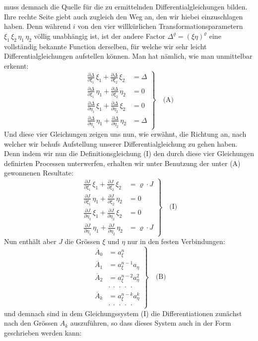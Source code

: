 \documentclass[11pt]{article}
\providecommand{\weberpage}[1]{}
\let\Delta\varDelta
\begin{document}
\weberpage{120}
muss demnach die Quelle f\"ur die zu ermittelnden Differentialgleichungen bilden. Ihre rechte Seite giebt auch zugleich den Weg an, den wir hiebei einzuschlagen haben. Denn w\"ahrend $i$ von den vier willk\"urlichen Transformationsparametern $\xi_1\, \xi_2\, \eta_1\, \eta_2$ v\"ollig unabh\"angig ist, ist der andere Factor $\Delta^{\varrho} = (\xi\eta)^{\varrho}$ eine vollst\"andig bekannte Function derselben, f\"ur welche wir sehr leicht Differentialgleichungen aufstellen k\"onnen. Man hat n\"amlich, wie man unmittelbar erkennt:
\[
\left.
\begin{aligned}
\frac{\partial \Delta}{\partial \xi_1}\, \xi_1 + \frac{\partial \Delta}{\partial \xi_2}\, \xi_2 &= \Delta\\
\frac{\partial \Delta}{\partial \xi_1}\, \eta_1 + \frac{\partial \Delta}{\partial \xi_2}\, \eta_2 &= 0\\
\frac{\partial \Delta}{\partial \eta_1}\, \xi_1 + \frac{\partial \Delta}{\partial \eta_2}\, \xi_2 &= 0\\
\frac{\partial \Delta}{\partial \eta_1}\, \eta_1 + \frac{\partial \Delta}{\partial \eta_2}\, \eta_2 &= \Delta
\end{aligned}
\right\}\quad \text{(A)}
\]
Und diese vier Gleichungen zeigen uns nun, wie erw\"ahnt, die Richtung an, nach welcher wir behufs Aufstellung unserer Differentialgleichung zu gehen haben. Denn indem wir nun die Definitionsgleichung (I) den durch diese vier Gleichungen definirten Processen unterwerfen, erhalten wir unter Benutzung der unter (A) gewonnenen Resultate:
\[
\left.
\begin{aligned}
\frac{\partial J}{\partial \xi_1}\, \xi_1 + \frac{\partial J}{\partial \xi_2}\, \xi_2 &= \varrho \cdot J\\
\frac{\partial J}{\partial \xi_1}\, \eta_1 + \frac{\partial J}{\partial \xi_2}\, \eta_2 &= 0\\
\frac{\partial J}{\partial \eta_1}\, \xi_1 + \frac{\partial J}{\partial \eta_2}\, \xi_2 &= 0\\
\frac{\partial J}{\partial \eta_1}\, \eta_1 + \frac{\partial J}{\partial \eta_2}\, \eta_2 &= \varrho \cdot J
\end{aligned}
\right\}\quad \text{(I)}
\]
Nun enth\"alt aber $J$ die Gr\"ossen $\xi$ und $\eta$ nur in den festen Verbindungen:
\[
\left.
\begin{aligned}
\overline{A}_0 &= a_{\xi}^n\\
\overline{A}_1 &= a_{\xi}^{n-1} a_{\eta}\\
\overline{A}_2 &= a_{\xi}^{n-2} a_{\eta}^2\\
&\cdot\ \cdot\ \cdot\ \cdot\ \cdot\\
\overline{A}_k &= a_{\xi}^{n-k} a_{\eta}^k\\
&\cdot\ \cdot\ \cdot\ \cdot\ \cdot
\end{aligned}
\right\}\quad \text{(B)}
\]
und demnach sind in dem Gleichungssystem (I) die Differentiationen zun\"achst nach den Gr\"ossen $A_k$ auszuf\"uhren, so dass dieses System auch in der Form geschrieben werden kann:
\end{document}
